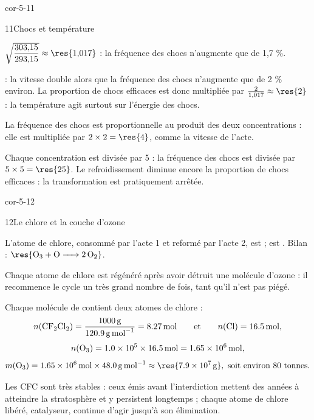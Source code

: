 \begin{blocLivre}{cor-5-11}
\begin{corrige}{11}{Chocs et température}
\begin{questions}
\item $\sqrt{\dfrac{303{,}15}{293{,}15}}\approx\res{1{,}017}$ : la fréquence des chocs n'augmente que de 1,7 \%.
\item {} : la vitesse double alors que la fréquence des chocs n'augmente que de 2 \% environ. La
proportion de chocs efficaces est donc multipliée par $\frac{2}{1{,}017}\approx\res{2}$ : la température agit
surtout sur l'énergie des chocs.
\item La fréquence des chocs est proportionnelle au produit des deux concentrations : elle est multipliée par
$2\times2=\res{4}$, comme la vitesse de l'acte.
\item Chaque concentration est divisée par 5 : la fréquence des chocs est divisée par $5\times5=\res{25}$. Le
refroidissement diminue encore la proportion de chocs efficaces : la transformation est pratiquement arrêtée.
\end{questions}
\end{corrige}
\end{blocLivre}
\begin{blocLivre}{cor-5-12}
\begin{corrige}{12}{Le chlore et la couche d'ozone}
\begin{questions}
\item L'atome de chlore, consommé par l'acte 1 et reformé par l'acte 2, est  ;  est
. Bilan : $\res{\ce{O3 + O -> 2 O2}}$.
\item Chaque atome de chlore est régénéré après avoir détruit une molécule d'ozone : il recommence le cycle un très
grand nombre de fois, tant qu'il n'est pas piégé.
\item Chaque molécule de  contient deux atomes de chlore :
\[n(\ce{CF2Cl2})=\frac{\qty{1000}{g}}{\qty{120,9}{g.mol^{-1}}}=\qty{8,27}{mol}\qquad\text{et}\qquad n(\ce{Cl})=\qty{16,5}{mol},\]
\[n(\ce{O3})=\num{1.0e5}\times\qty{16,5}{mol}=\qty{1,65e6}{mol},\]
\[m(\ce{O3})=\qty{1,65e6}{mol}\times\qty{48,0}{g.mol^{-1}}\approx\res{\qty{7,9e7}{g}},\ \text{soit environ 80 tonnes}.\]
\item Les CFC sont très stables : ceux émis avant l'interdiction mettent des années à atteindre la stratosphère et y
persistent longtemps ; chaque atome de chlore libéré, catalyseur, continue d'agir jusqu'à son élimination.
\end{questions}
\end{corrige}
\end{blocLivre}
